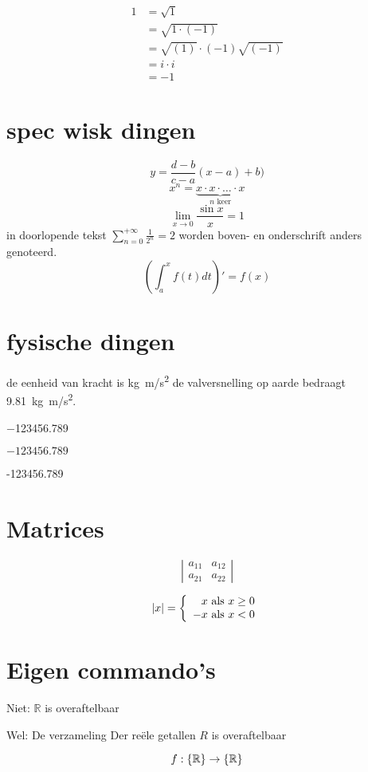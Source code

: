 \documentclass{article}
\newcommand{\R}{\ensuremath\{\mathbb{R}\}}
\begin{document}
\begin{align*}
	1 & = \sqrt{1} \\
 	  & = \sqrt{1 \cdot(-1)}\\
 	  & = \sqrt{(1)} \cdot(-1)\sqrt{(-1)}\\
 	  &= i \cdot i \\
 	  &= -1
\end{align*}

\section{spec wisk dingen}
\[y=\frac{d-b}{c-a}(x-a)+b) \]
\[x^n= \underbrace{ x\cdot x\cdot \ldots \cdot x}_{n \text{ keer}}\]
\[\lim_{x\to 0} \frac{\sin x} {x}=1 \]
in doorlopende tekst
\(\sum_{n=0}^{+\infty} \frac{1}{2^n} = 2\)
worden boven- en onderschrift anders genoteerd.
\[\left(\int_a^x f(t) dt\right)'=f(x) \]

\section{fysische dingen}
de eenheid van kracht is \si{kg m/s^2}
de valversnelling op aarde bedraagt
\SI{9.81}{kg m/s^2}.

\num{-123456.789}

\(-123456.789\)

-123456.789

\section{Matrices}
\[
\left |
\begin{array}{ll}
    a_{11}	& a_{12} \\
    a_{21}	& a_{22}    

\end{array} 
\right |
\]

\[
|x|= \left\{\begin{array}{r@{\text{ als }}l}
x & x\geq 0\\
-x & x<0
\end{array}
\right.
\]

\section{Eigen commando's}
Niet: \(\mathbb{R}\) is overaftelbaar

Wel: De verzameling Der reële getallen \(R\)  is overaftelbaar

\[f: \R \to \R \]



\end{document}
